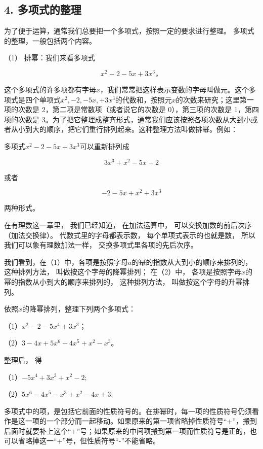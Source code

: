 \subsection{4. 多项式的整理}

为了便于运算，通常我们总要把一个多项式，按照一定的要求进行整理。
多项式的整理，一般包括两个内容。

（1） 排幂：我们来看多项式

\[
x ^{2} - 2 - 5 x + 3 x ^{3}\text{，}
\]

这个多项式的许多项都有字母\(x\)，我们常常把这样表示变数的字母叫做元。这个多项式是四个单项式\(x^2, -2, -5x, +3x^3\)的代数和，按照元\(x\)的次数来研究；这里第一项的次数是
2，第二项是常数项（或者说它的次数是 0），第三项的次数是
1，第四项的次数是
3。为了把它整理成整齐形式，通常我们应该按照各项次数从大到小或者从小到大的顺序，把它们重行排列起来。这种整理方法叫做排幂。例如：

多项式\(x^{2} - 2 - 5x + 3x^{3}\)可以重新排列成

\[
3 x ^{3} + x ^{2} - 5 x - 2 \tag {1}
\]

或者

\[
- 2 - 5 x + x ^{2} + 3 x ^{3} \tag {2}
\]

两种形式。

 在有理数这一章里， 我们已经知道， 在加法运算中，
可以交换加数的前后次序（加法交换律）。 代数式里的字母都表示数，
每个单项式表示的也就是数， 所以我们可以象有理数加法一样，
交换多项式里各项的先后次序。

我们看到，在（1）中，各项是按照字母\(a\)的幂的指数从大到小的顺序来排列的，
这种排列方法， 叫做按这个字母的降幂排列； 在（2）中，
各项是按照字母\(x\)的幂的指数从小到大的顺序来排列的， 这种排列方法，
叫做按这个字母的升幂排列。

 依照\(x\)的降幂排列，整理下列两个多项式：

（1）\(x^{2} - 2 - 5x^{4} + 3x^{3}\)；

（2）\(3 - 4x + 5x^{6} - 4x^{5} + x^{2} - x^{3}\)。

 整理后， 得

（1）\(-5x^{4} + 3x^{3} + x^{2} - 2;\)

（2）\(5x^{6} - 4x^{5} - x^{3} + x^{2} - 4x + 3.\)

多项式中的项，是包括它前面的性质符号的。在排幂时，每一项的性质符号仍须看作是这一项的一个部分而一起移动。如果原来的第一项省略掉性质符号``+''，搬到后面时就要补上这个``+''号；如果原来的中间项搬到第一项而性质符号是正的，也可以省略掉这一``+''号，但性质符号``-''不能省略。


